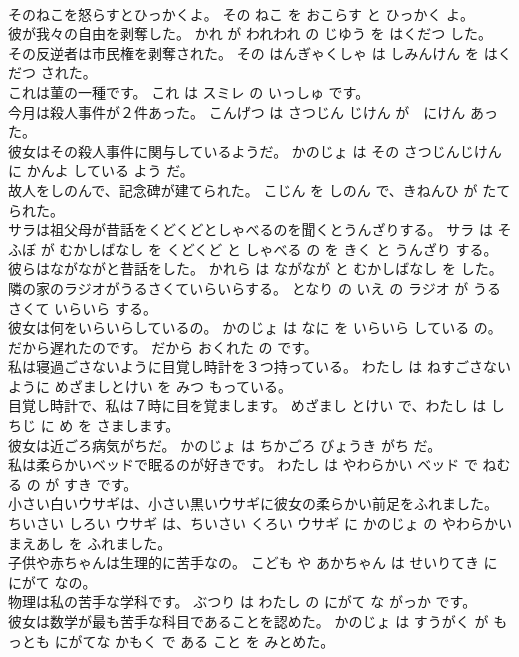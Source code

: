 \documentclass[8pt]{extreport}
\begin{document}
\begin{CJK}{UTF8}{min}
\\	そのねこを怒らすとひっかくよ。	その ねこ を おこらす と ひっかく よ。	
\\	彼が我々の自由を剥奪した。	かれ が われわれ の じゆう を はくだつ した。	
\\	その反逆者は市民権を剥奪された。	その はんぎゃくしゃ は しみんけん を はくだつ された。	
\\	これは菫の一種です。	これ は スミレ の いっしゅ です。	
\\	今月は殺人事件が２件あった。	こんげつ は さつじん じけん が　にけん あった。	
\\	彼女はその殺人事件に関与しているようだ。	かのじょ は その さつじんじけん に かんよ している よう だ。	
\\	故人をしのんで、記念碑が建てられた。	こじん を しのん で、きねんひ が たてられた。	
\\	サラは祖父母が昔話をくどくどとしゃべるのを聞くとうんざりする。	サラ は そふぼ が むかしばなし を くどくど と しゃべる の を きく と うんざり する。	
\\	彼らはながながと昔話をした。	かれら は ながなが と むかしばなし を した。	
\\	隣の家のラジオがうるさくていらいらする。	となり の いえ の ラジオ が うるさくて いらいら する。	
\\	彼女は何をいらいらしているの。	かのじょ は なに を いらいら している の。	
\\	だから遅れたのです。	だから おくれた の です。	
\\	私は寝過ごさないように目覚し時計を３つ持っている。	わたし は ねすごさない ように めざましとけい を みつ もっている。	
\\	目覚し時計で、私は７時に目を覚まします。	めざまし とけい で、わたし は しちじ に め を さまします。	
\\	彼女は近ごろ病気がちだ。	かのじょ は ちかごろ びょうき がち だ。	
\\	私は柔らかいベッドで眠るのが好きです。	わたし は やわらかい ベッド で ねむる の が すき です。	
\\	小さい白いウサギは、小さい黒いウサギに彼女の柔らかい前足をふれました。	ちいさい しろい ウサギ は、ちいさい くろい ウサギ に かのじょ の やわらかい まえあし を ふれました。	
\\	子供や赤ちゃんは生理的に苦手なの。	こども や あかちゃん は せいりてき に にがて なの。	
\\	物理は私の苦手な学科です。	ぶつり は わたし の にがて な がっか です。	
\\	彼女は数学が最も苦手な科目であることを認めた。	かのじょ は すうがく が もっとも にがてな かもく で ある こと を みとめた。	

\end{CJK}
\end{document}
